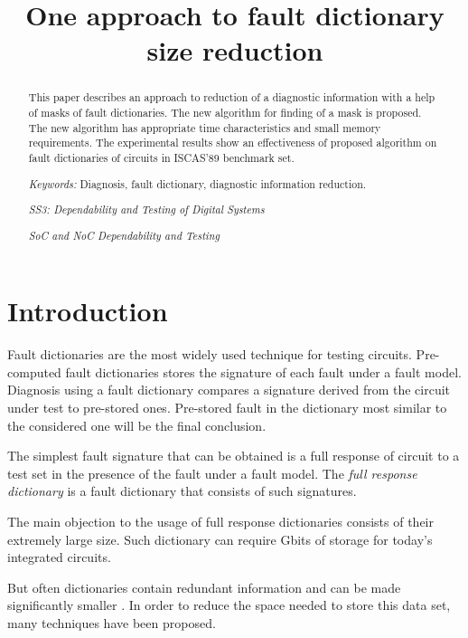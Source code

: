 \documentclass{article}
\begin{document}
\title {One approach to fault dictionary size
reduction}


\maketitle

\begin{abstract}
    This paper describes  an approach to reduction of a diagnostic
    information with a help of masks of fault dictionaries. The
    new algorithm for finding of a mask is proposed. The new
    algorithm has appropriate time characteristics and small
    memory requirements. The experimental results show an
    effectiveness of proposed algorithm on  fault dictionaries of
    circuits in ISCAS'89 benchmark set.

    {\it Keywords:} Diagnosis, fault dictionary, diagnostic
    information reduction.

    \emph{SS3: Dependability and Testing of Digital Systems}

    \emph{SoC and NoC Dependability and Testing}

\end{abstract}


\section{Introduction}

Fault dictionaries are the  most widely  used technique for
testing circuits. Pre-computed fault dictionaries stores the
signature of each fault under a fault model. Diagnosis using a
fault dictionary compares a signature derived from the circuit
under test to pre-stored ones. Pre-stored fault in the dictionary
most similar to the considered one will be the final conclusion.

The simplest fault signature that can be obtained is a full
response of circuit to a test set in the presence of the fault
under a fault model. The \emph{full response dictionary} is a
fault dictionary that consists of such signatures.

The main objection to the usage of full response dictionaries
consists of their extremely large size. Such dictionary can
require Gbits of storage for today's integrated circuits.

But often dictionaries  contain redundant information and can be
made significantly smaller \cite{Ryan-Fuchs-Pomeranz, Speran-book,
Boppana-HF, Boppana-F, Arslan-Orailoglu, Pomeranz-Reddy, Chess-L}.
In order to reduce the space needed to store this data set, many
techniques have been proposed.
\end{document}
